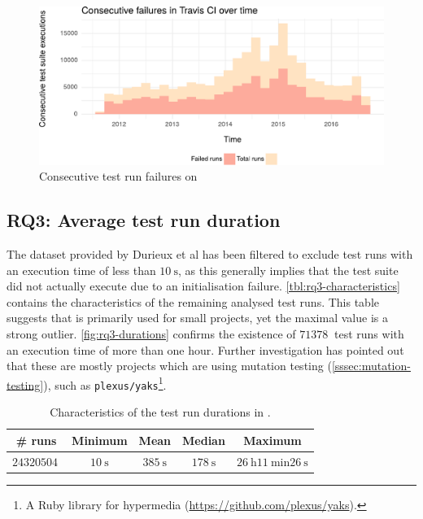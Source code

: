 \begin{figure}[htbp!]
	\centering
	\includegraphics[width=\textwidth]{assets/charts/rq2-consecutive-failure.pdf}
	\caption{Consecutive test run failures on \travisci{}}
	\label{fig:rq2-consecutive-failure}
\end{figure}

\subsection{RQ3: Average test run duration}
The \travisci{} dataset provided by Durieux et al \cite{travisanalysis} has been filtered to exclude test runs with an execution time of less than $\SI{10}{\second}$, as this generally implies that the test suite did not actually execute due to an initialisation failure. \autoref{tbl:rq3-characteristics} contains the characteristics of the remaining analysed test runs. This table suggests that \travisci{} is primarily used for small projects, yet the maximal value is a strong outlier. \autoref{fig:rq3-durations} confirms the existence of $\SI{71378}{}$ test runs with an execution time of more than one hour. Further investigation has pointed out that these are mostly projects which are using mutation testing (\autoref{sssec:mutation-testing}), such as \texttt{plexus/yaks}\footnote{A Ruby library for hypermedia (\url{https://github.com/plexus/yaks}).}.

\begin{table}[h]
	\centering
	\begin{tabularx}{\textwidth}{|C|C|C|C|C|}
		\hline
		\textbf{\# runs} & \textbf{Minimum} & \textbf{Mean} & \textbf{Median} & \textbf{Maximum}\\
		\hline
		$\SI{24320504}{}$ & $\SI{10}{\second}$ & $\SI{385}{\second}$ & $\SI{178}{\second}$ & $\SI{26}{\hour} \SI{11}{\minute} \SI{26}{\second}$\\
		\hline
	\end{tabularx}
	\caption{Characteristics of the test run durations in \cite{travisanalysis}.}
	\label{tbl:rq3-characteristics}
\end{table}

